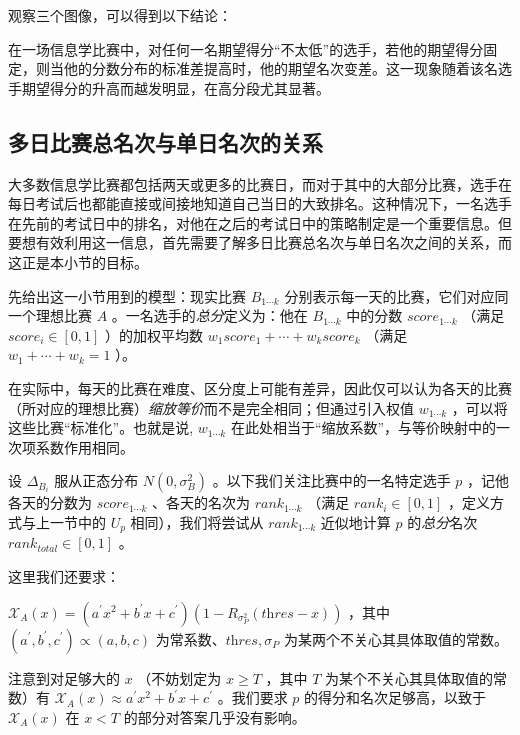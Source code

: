             观察三个图像，可以得到以下结论：

            \begin{tcolorbox}[colback=white,colframe=black,boxrule=0.5pt,arc=0pt]
                在一场信息学比赛中，对任何一名期望得分“不太低”的选手，若他的期望得分固定，则当他的分数分布的标准差提高时，他的期望名次变差。这一现象随着该名选手期望得分的升高而越发明显，在高分段尤其显著。
            \end{tcolorbox}

    \subsection{多日比赛总名次与单日名次的关系}

        大多数信息学比赛都包括两天或更多的比赛日，而对于其中的大部分比赛，选手在每日考试后也都能直接或间接地知道自己当日的大致排名。这种情况下，一名选手在先前的考试日中的排名，对他在之后的考试日中的策略制定是一个重要信息。但要想有效利用这一信息，首先需要了解多日比赛总名次与单日名次之间的关系，而这正是本小节的目标。

        \vspace{1.5ex}

        先给出这一小节用到的模型：现实比赛 $B_{1\cdots k}$ 分别表示每一天的比赛，它们对应同一个理想比赛 $A$ 。一名选手的\emph{总分}定义为：他在 $B_{1\cdots k}$ 中的分数 $\textit{score}_{1\cdots k}$ （满足 $\textit{score}_i\in[0,1]$ ）的加权平均数 $w_1\textit{score}_1+\cdots+w_k\textit{score}_k$ （满足 $w_1+\cdots+w_k=1$ ）。

        在实际中，每天的比赛在难度、区分度上可能有差异，因此仅可以认为各天的比赛（所对应的理想比赛）\emph{缩放等价}而不是完全相同；但通过引入权值 $w_{1\cdots k}$ ，可以将这些比赛“标准化”。也就是说, $w_{1\cdots k}$ 在此处相当于“缩放系数”，与等价映射中的一次项系数作用相同。

        设 $\Delta_{B_i}$ 服从正态分布 $N(0,\sigma_B^2)$ 。以下我们关注比赛中的一名特定选手 $p$ ，记他各天的分数为 $\textit{score}_{1\cdots k}$ 、各天的名次为 $\textit{rank}_{1\cdots k}$ （满足 $\textit{rank}_i\in [0,1]$ ，定义方式与上一节中的 $U_p$ 相同），我们将尝试从 $\textit{rank}_{1\cdots k}$ 近似地计算 $p$ 的\emph{总分}名次 $\textit{rank}_{\textit{total}}\in [0,1]$ 。
        
        这里我们还要求：
        \begin{asparaitem}
            \item $\mathcal{X}_A(x)=\left(a^\prime x^2+b^\prime x+c^\prime\right)\left(1-R_{\sigma_P^2}(\textit{thres}-x)\right)$ ，其中 $(a^\prime,b^\prime,c^\prime)\propto (a,b,c)$ 为常系数、$\textit{thres},\sigma_P$ 为某两个不关心其具体取值的常数。
            \item 注意到对足够大的 $x$ （不妨划定为 $x\geq T$ ，其中 $T$ 为某个不关心其具体取值的常数）有 $\mathcal{X}_A(x)\approx a^\prime x^2+b^\prime x+c^\prime$ 。我们要求 $p$ 的得分和名次足够高，以致于 $\mathcal{X}_A(x)$ 在 $x<T$ 的部分对答案几乎没有影响。
        \end{asparaitem}

